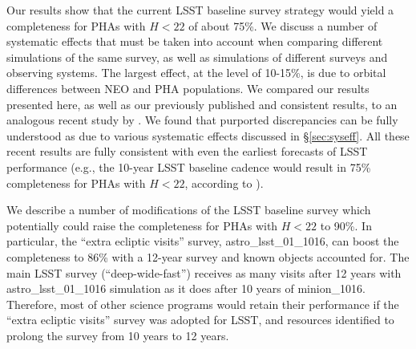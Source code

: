 Our results show that the current LSST baseline survey strategy would yield a completeness for PHAs
with $H<22$ of about 75\%. We discuss a number of systematic effects that must be taken into
account when comparing different simulations of the same survey, as well as simulations of different
surveys and observing systems. The largest effect, at the level of 10-15\%, is due to orbital differences
between NEO and PHA populations. We compared our results presented here, as well as our previously
published and consistent results, to an analogous recent study by \citet[]{GMS2016}. We found that
purported discrepancies can be fully understood as due to various systematic effects discussed in
\S\ref{sec:syseff}. All these recent results are fully consistent with even the earliest forecasts of LSST
performance (e.g., the 10-year LSST baseline cadence would result in 75\% completeness for PHAs
with $H<22$, according to \citealt{IvezicNEO2007}).

We describe a number of modifications of the LSST baseline survey which potentially could raise the
completeness for PHAs with $H<22$ to 90\%. In particular, the ``extra ecliptic visits'' survey,
astro\_lsst\_01\_1016, can boost the completeness to 86\% with a 12-year survey and known objects
accounted for. The main LSST survey (``deep-wide-fast'') receives as many visits after 12 years
with astro\_lsst\_01\_1016 simulation as it does after 10 years of minion\_1016. Therefore,
most of other science programs would retain their performance if the ``extra ecliptic visits'' survey
was adopted for LSST, and resources identified to prolong the survey from 10 years to 12 years.
